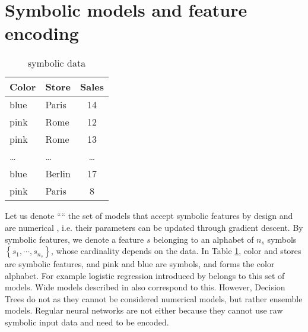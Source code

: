 \section{Symbolic models and feature encoding}\label{sec:encoding}


\begin{table}[h!]%
  \caption{symbolic data}
  \label{tab:catData}
  \begin{footnotesize}
  \begin{center}
  \begin{tabular}{llc}
    \toprule
    Color & Store & Sales \\
    \midrule
    blue  & Paris    & 14 \\
    pink  & Rome     & 12 \\
    pink  & Rome     & 13 \\
    \dots & \dots    & \dots \\
    blue  & Berlin     & 17 \\
    pink  & Paris     & 8  \\
  \bottomrule
\end{tabular}
\end{center}
\end{footnotesize}
\end{table}

Let us denote ``\catmod`` the set of models that accept symbolic features by design and are numerical , i.e. their parameters can be updated through gradient descent.
By symbolic features, we denote a feature $s$ belonging to an alphabet of $n_{s}$ symbols $\left\{s_1,\cdots, s_{n_{s}} \right\}$, whose cardinality depends on the data. In Table \ref{tab:catData}, color and stores are symbolic features, and pink and blue are symbols, and forms the color alphabet. For example logistic regression introduced by \cite{cox1958regression} belongs to this set of models. 
Wide models described in \cite{wideAndDeep} also correspond to this.
However, Decision Trees do not as they cannot be considered numerical models, but rather ensemble models. Regular neural networks are not \catmod either because they cannot use raw symbolic input data and need to be encoded.


